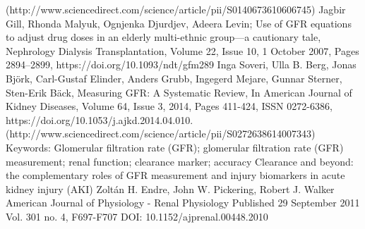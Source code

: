 \documentclass[10pt,final]{siamltex}
\begin{document}
\begin{thebibliography}{99}
(http://www.sciencedirect.com/science/article/pii/S0140673610606745)
Jagbir Gill, Rhonda Malyuk, Ognjenka Djurdjev, Adeera Levin; Use of GFR equations to adjust drug doses in an elderly multi-ethnic group—a cautionary tale, Nephrology Dialysis Transplantation, Volume 22, Issue 10, 1 October 2007, Pages 2894–2899, https://doi.org/10.1093/ndt/gfm289
Inga Soveri, Ulla B. Berg, Jonas Björk, Carl-Gustaf Elinder, Anders Grubb, Ingegerd Mejare, Gunnar Sterner, Sten-Erik Bäck, Measuring GFR: A Systematic Review, In American Journal of Kidney Diseases, Volume 64, Issue 3, 2014, Pages 411-424, ISSN 0272-6386, https://doi.org/10.1053/j.ajkd.2014.04.010.
(http://www.sciencedirect.com/science/article/pii/S0272638614007343)
Keywords: Glomerular filtration rate (GFR); glomerular filtration rate (GFR) measurement; renal function; clearance marker; accuracy
Clearance and beyond: the complementary roles of GFR measurement and injury biomarkers in acute kidney injury (AKI)
Zoltán H. Endre, John W. Pickering, Robert J. Walker
American Journal of Physiology - Renal Physiology Published 29 September 2011 Vol. 301 no. 4, F697-F707 DOI: 10.1152/ajprenal.00448.2010



\end{thebibliography}
\end{document}
